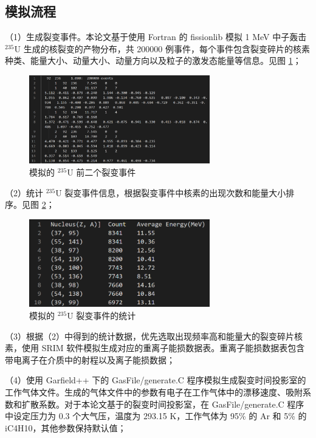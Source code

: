 \documentclass[AutoFakeBold]{LZUThesis}
\begin{document}
\subsection{模拟流程}
（1）生成裂变事件。本论文基于使用 Fortran 的 fissionlib 模拟 1 MeV 中子轰击 $^{235}$U 生成的核裂变的产物分布，共 200000 例事件，每个事件包含裂变碎片的核素种类、能量大小、动量大小、动量方向以及粒子的激发态能量等信息。见图 \ref{fig_U_235_events}；

\begin{figure}[H]
    \centering
    \includegraphics[width=0.7\textwidth]{figures/U-235-events.png}
    \caption{模拟的 $^{235}$U 前二个裂变事件}
    \label{fig_U_235_events}
\end{figure}

（2）统计 $^{235}$U 裂变事件信息，根据裂变事件中核素的出现次数和能量大小排序。见图 \ref{fig_statistics}；

\begin{figure}[H]
    \centering
    \includegraphics[width=0.7\textwidth]{figures/statistics.png}
    \caption{模拟的 $^{235}$U 裂变事件的统计}
    \label{fig_statistics}
\end{figure}

（3）根据（2）中得到的统计数据，优先选取出现频率高和能量大的裂变碎片核素，使用 SRIM 软件模拟生成对应的重离子能损数据表。重离子能损数据表包含带电离子在介质中的射程以及离子能损数据\cite{魏康2019基于GEM工艺的裂变时间投影室中裂变碎片的讨论, ziegler2010srim}；

（4）使用 Garfield++ 下的 GasFile/generate.C 程序模拟生成裂变时间投影室的工作气体文件。生成的气体文件中的参数有电子在工作气体中的漂移速度、吸附系数和扩散系数\cite{闫洋洋2018用于高精度裂变截面测量的时间投影室}。对于本论文基于的裂变时间投影室，在 GasFile/generate.C 程序中设定压力为 0.3 个大气压，温度为 293.15 K，工作气体为 95\% 的 Ar 和 5\% 的 iC4H10，其他参数保持默认值；
\end{document}
